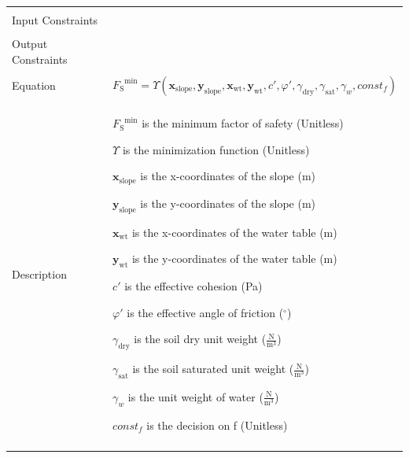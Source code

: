 \documentclass[12pt]{article}
\begin{document}
\begin{minipage}{\textwidth}
\begin{tabular}{>{\raggedright}p{}>{\raggedright\arraybackslash}p{}}
\\ \midrule \\
Input Constraints & 
\\ \midrule \\
Output Constraints & 
\\ \midrule \\
Equation & \begin{displaymath}
           {{F_{\text{S}}}^{\text{min}}}=Υ\left({\mathbf{x}_{\text{slope}}},{\mathbf{y}_{\text{slope}}},{\mathbf{x}_{\text{wt}}},{\mathbf{y}_{\text{wt}}},c',φ',{γ_{\text{dry}}},{γ_{\text{sat}}},{γ_{w}},const_f\right)
           \end{displaymath}
\\ \midrule \\
Description & \begin{symbDescription}
              \item{${{F_{\text{S}}}^{\text{min}}}$ is the minimum factor of safety (Unitless)}
              \item{$Υ$ is the minimization function (Unitless)}
              \item{${\mathbf{x}_{\text{slope}}}$ is the x-coordinates of the slope (m)}
              \item{${\mathbf{y}_{\text{slope}}}$ is the y-coordinates of the slope (m)}
              \item{${\mathbf{x}_{\text{wt}}}$ is the x-coordinates of the water table (m)}
              \item{${\mathbf{y}_{\text{wt}}}$ is the y-coordinates of the water table (m)}
              \item{$c'$ is the effective cohesion (Pa)}
              \item{$φ'$ is the effective angle of friction (${}^{\circ}$)}
              \item{${γ_{\text{dry}}}$ is the soil dry unit weight ($\frac{\text{N}}{\text{m}^{3}}$)}
              \item{${γ_{\text{sat}}}$ is the soil saturated unit weight ($\frac{\text{N}}{\text{m}^{3}}$)}
              \item{${γ_{w}}$ is the unit weight of water ($\frac{\text{N}}{\text{m}^{3}}$)}
              \item{$const_f$ is the decision on f (Unitless)}
              \end{symbDescription}
\\ \midrule \\

\end{tabular}
\end{minipage}
\end{document}
